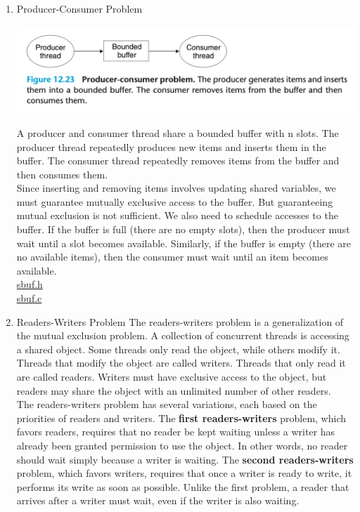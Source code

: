 \documentclass[11pt]{article}
\begin{document}
\begin{enumerate}
\item Producer-Consumer Problem
\label{sec:org8c694fb}

\begin{center}
\includegraphics[width=.9\linewidth]{pics/figure12.23-producer-consumer.png}
\end{center}

A producer and consumer thread share a bounded buffer with n slots. The producer thread repeatedly produces new items and inserts them in the buffer. The consumer thread repeatedly removes items from the buffer and then consumes them.\\

Since inserting and removing items involves updating shared variables, we must guarantee mutually exclusive access to the buffer. But guaranteeing mutual exclusion is not sufficient. We also need to schedule accesses to the buffer. If the buffer is full (there are no empty slots), then the producer must wait until a slot becomes available. Similarly, if the buffer is empty (there are no available items), then the consumer must wait until an item becomes available.\\


\href{code/c12-concurrent-programming/sbuf.h}{sbuf.h}\\
\href{code/c12-concurrent-programming/sbuf.c}{sbuf.c}\\


\item Readers-Writers Problem
\label{sec:org3a5d457}
The readers-writers problem is a generalization of the mutual exclusion problem. A collection of concurrent threads is accessing a shared object. Some threads only read the object, while others modify it. Threads that modify the object are called writers. Threads that only read it are called readers. Writers must have exclusive access to the object, but readers may share the object with an unlimited number of other readers.\\


The readers-writers problem has several variations, each based on the priorities of readers and writers. The \textbf{first readers-writers} problem, which favors readers, requires that no reader be kept waiting unless a writer has already been granted permission to use the object. In other words, no reader should wait simply because a writer is waiting. The \textbf{second readers-writers} problem, which favors writers, requires that once a writer is ready to write, it performs its write as soon as possible. Unlike the first problem, a reader that arrives after a writer must wait, even if the writer is also waiting.\\



\end{enumerate}
\end{document}
